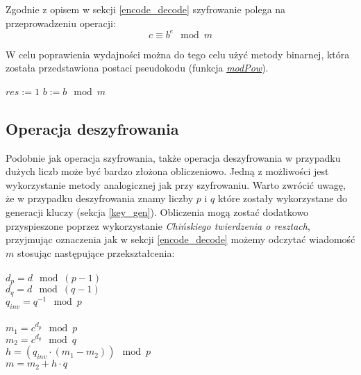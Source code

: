 \documentclass[10pt,a4paper]{article}
\begin{document}
Zgodnie z opisem w sekcji \ref{encode_decode} szyfrowanie polega na przeprowadzeniu operacji:
\begin{equation}
c \equiv b^e \mod m
\end{equation}

W celu poprawienia wydajności można do tego celu użyć metody binarnej, która została przedstawiona postaci pseudokodu (funkcja \hyperref[fun_modPow]{\textit{modPow}}).


\begin{algorithm} \label{fun_modPow}
\begin{algorithmic}[1]
\EndIf

\State $res := 1$
\State $b := b \mod m$
	\EndIf
\EndWhile

\State {}
\EndFunction
\end{algorithmic}
\end{algorithm}

\subsection{Operacja deszyfrowania}

Podobnie jak operacja szyfrowania, także operacja deszyfrowania w przypadku dużych liczb może być bardzo złożona obliczeniowo. Jedną z możliwości jest wykorzystanie metody analogicznej jak przy szyfrowaniu. Warto zwrócić uwagę, że w przypadku deszyfrowania znamy liczby $p$ i $q$ które zostały wykorzystane do generacji kluczy (sekcja \ref{key_gen}). Obliczenia mogą zostać dodatkowo przyspieszone poprzez wykorzystanie \textit{Chińskiego twierdzenia o resztach}, przyjmując oznaczenia jak w sekcji \ref{encode_decode} możemy odczytać wiadomość $m$ stosując następujące przekształcenia:\\
\\
$d_p = d \mod (p-1)$\\ 
$d_q = d \mod (q-1)$\\
$q_{inv} = q^{-1} \mod p$\\ \\ 
$m_1 = c^{d_p} \mod p$\\
$m_2 = c^{d_q} \mod q$\\
$h = (q_{inv} \cdot (m_1 - m_2)) \mod p$\\
$m = m_2 + h \cdot q$\\
\end{document}
